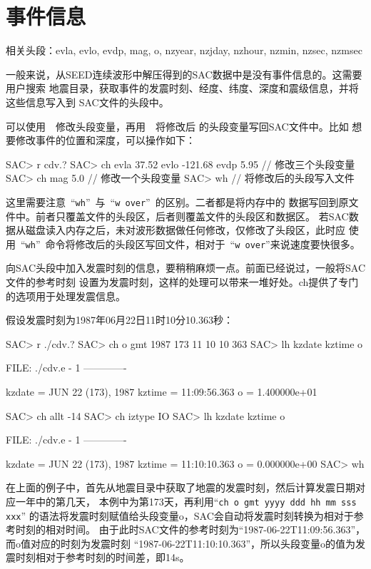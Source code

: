 \section{事件信息}
\label{sec:event-info}
相关头段：evla, evlo, evdp, mag, o, nzyear, nzjday, nzhour, nzmin, nzsec, nzmsec

一般来说，从SEED连续波形中解压得到的SAC数据中是没有事件信息的。这需要用户搜索
地震目录，获取事件的发震时刻、经度、纬度、深度和震级信息，并将这些信息写入到
SAC文件的头段中。

可以使用~~修改头段变量，再用~~将修改后
的头段变量写回SAC文件中。比如
想要修改事件的位置和深度，可以操作如下：
\begin{SACCode}
SAC> r cdv.?
SAC> ch evla 37.52 evlo -121.68 evdp 5.95   // 修改三个头段变量
SAC> ch mag 5.0                             // 修改一个头段变量
SAC> wh                                     // 将修改后的头段写入文件
\end{SACCode}

这里需要注意~``\verb+wh+''~与~``\verb+w over+''~的区别。二者都是将内存中的
数据写回到原文件中。前者只覆盖文件的头段区，后者则覆盖文件的头段区和数据区。
若SAC数据从磁盘读入内存之后，未对波形数据做任何修改，仅修改了头段区，此时应
使用~``\verb+wh+''~命令将修改后的头段区写回文件，相对于~``\verb+w over+''来说速度要快很多。

向SAC头段中加入发震时刻的信息，要稍稍麻烦一点。前面已经说过，一般将SAC文件的参考时刻
设置为发震时刻，这样的处理可以带来一堆好处。ch提供了专门的选项用于处理发震信息。

假设发震时刻为1987年06月22日11时10分10.363秒：
\label{code:origin-time}
\begin{SACCode}
SAC> r ./cdv.?
SAC> ch o gmt 1987 173 11 10 10 363
SAC> lh kzdate kztime o
  
  FILE: ./cdv.e - 1
 -------------

     kzdate = JUN 22 (173), 1987
     kztime = 11:09:56.363
          o = 1.400000e+01
  
SAC> ch allt -14
SAC> ch iztype IO
SAC> lh kzdate kztime o
  
  FILE: ./cdv.e - 1
 -------------

     kzdate = JUN 22 (173), 1987
     kztime = 11:10:10.363
          o = 0.000000e+00
SAC> wh
\end{SACCode}

在上面的例子中，首先从地震目录中获取了地震的发震时刻，然后计算发震日期对应一年中的第几天，
本例中为第173天，再利用``\verb+ch o gmt yyyy ddd hh mm sss xxx+''
的语法将发震时刻赋值给头段变量o，SAC会自动将发震时刻转换为相对于参考时刻的相对时间。
由于此时SAC文件的参考时刻为``1987-06-22T11:09:56.363''，而o值对应的时刻为发震时刻
``1987-06-22T11:10:10.363''，所以头段变量o的值为发震时刻相对于参考时刻的时间差，即14s。

